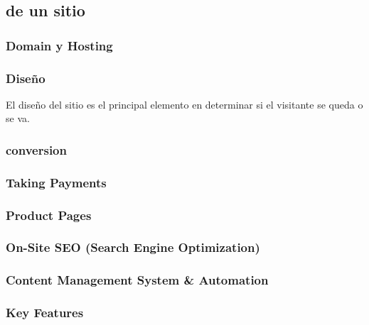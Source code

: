 
\subsection{\keyelements de un sitio \ecommerceCOM \cite{inbook_ecommerce_keyelements}}

\subsubsection{Domain y Hosting}

\subsubsection{Diseño}
El diseño del sitio es el principal elemento en determinar si el visitante se queda o se va.

\subsubsection{\usabilityQA}

\subsubsection{conversion}

\subsubsection{\checkoutCOM}

\subsubsection{Taking Payments}

\subsubsection{Product Pages}

\subsubsection{On-Site SEO (Search Engine Optimization)}

\subsubsection{Content Management System \& Automation}

\subsubsection{Key \ecommerceCOM Features}

